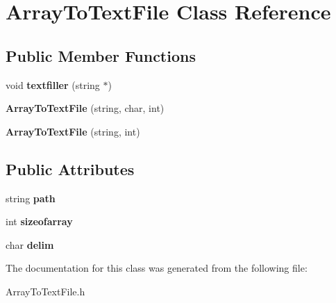 \hypertarget{class_array_to_text_file}{\section{Array\-To\-Text\-File Class Reference}
\label{class_array_to_text_file}
}
\subsection*{Public Member Functions}
\begin{DoxyCompactItemize}
\item 
\hypertarget{class_array_to_text_file_ab9b48cd0ad28251400913b61369449bf}{void {\bfseries textfiller} (string $\ast$)}\label{class_array_to_text_file_ab9b48cd0ad28251400913b61369449bf}

\item 
\hypertarget{class_array_to_text_file_aa38f9a94bde36e2dbbb662fac549a8e4}{{\bfseries Array\-To\-Text\-File} (string, char, int)}\label{class_array_to_text_file_aa38f9a94bde36e2dbbb662fac549a8e4}

\item 
\hypertarget{class_array_to_text_file_ad3c7fb7f44e29476e58d52ba36702518}{{\bfseries Array\-To\-Text\-File} (string, int)}\label{class_array_to_text_file_ad3c7fb7f44e29476e58d52ba36702518}

\end{DoxyCompactItemize}
\subsection*{Public Attributes}
\begin{DoxyCompactItemize}
\item 
\hypertarget{class_array_to_text_file_ab62041a3fdeb3558e3df87815ec4ab32}{string {\bfseries path}}\label{class_array_to_text_file_ab62041a3fdeb3558e3df87815ec4ab32}

\item 
\hypertarget{class_array_to_text_file_a4f6ea4f3b0e83c1b5f2b3882bab2c7c4}{int {\bfseries sizeofarray}}\label{class_array_to_text_file_a4f6ea4f3b0e83c1b5f2b3882bab2c7c4}

\item 
\hypertarget{class_array_to_text_file_a991650293bf0820743cc23b04bd1409d}{char {\bfseries delim}}\label{class_array_to_text_file_a991650293bf0820743cc23b04bd1409d}

\end{DoxyCompactItemize}


The documentation for this class was generated from the following file\-:\begin{DoxyCompactItemize}
\item 
Array\-To\-Text\-File.\-h\end{DoxyCompactItemize}
